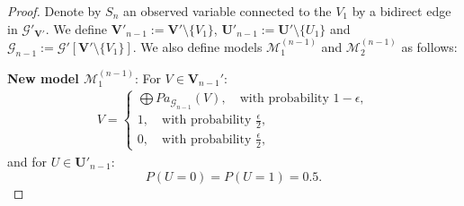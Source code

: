 \documentclass[accepted]{uai2022}
\newcommand{\Pa}[2]{\textit{Pa}_{#2}(#1)}
\newcommand{\V}[0]{\mathbf{V}}
\newcommand{\U}[0]{\mathbf{U}}
\newcommand{\G}[0]{\mathcal{G}}
\newcommand{\M}[0]{\mathcal{M}}
\begin{document}
\begin{proof}
        Denote by $S_n$ an observed variable connected to the $V_1$ by a bidirect edge in $\G'_{\mathbf{\V'}}$.
        We define $\V'_{n-1} := \V'\setminus \{V_1\}$, $\U'_{n-1} := \U'\setminus \{U_1\}$ and $\G_{n-1}:=\G'[\V' \setminus \{V_1\}]$.
        We also define models $\M_1^{(n-1)}$ and $\M_2^{(n-1)}$ as follows:
        
        \textbf{New model $\M_1^{(n-1)}$}: For $V \in \V_{n-1}'$:
        \begin{align}
            V = 
            \begin{cases}
                \bigoplus \Pa{V}{\G_{n-1}}, \quad \text{with probability } 1-\epsilon,\\
                1, \quad \text{with probability } \frac{\epsilon}{2},\\
                0, \quad \text{with probability } \frac{\epsilon}{2},
            \end{cases}
        \end{align}
        and for $U \in \U'_{n-1}$:
        \begin{equation*}
            P(U=0)= P(U=1) = 0.5.
        \end{equation*}
        

\end{proof}
\end{document}
